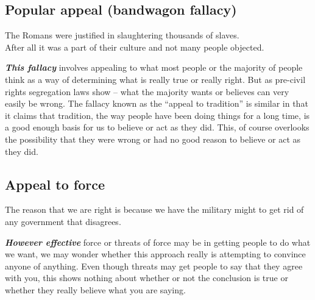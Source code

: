 \documentclass[12pt, openany]{book}
\begin{document}
\hypertarget{popular-appeal-bandwagon-fallacy}{%
\subsection*{Popular appeal (bandwagon fallacy)}\label{popular-appeal-bandwagon-fallacy}}


\begin{center}

\begin{argument}

The Romans were justified in slaughtering thousands of slaves.\\

After all it was a part of their culture and not many people objected.

\end{argument}

\end{center}

\textbf{\emph{This fallacy}} involves appealing to what most people or the majority of people think as a way of determining what is really true or really right. But as pre-civil rights segregation laws show -- what the majority wants or believes can very easily be wrong. The fallacy known as the ``appeal to tradition'' is similar in that it claims that tradition, the way people have been doing things for a long time, is a good enough basis for us to believe or act as they did. This, of course overlooks the possibility that they were wrong or had no good reason to believe or act as they did.

\hypertarget{appeal-to-force}{%
\subsection*{Appeal to force}\label{appeal-to-force}}


\begin{center}

\begin{argument}

The reason that we are right is because we have the military might to get rid of any government that disagrees.

\end{argument}

\end{center}

\textbf{\emph{However effective}} force or threats of force may be in getting people to do what we want, we may wonder whether this approach really is attempting to convince anyone of anything. Even though threats may get people to say that they agree with you, this shows nothing about whether or not the conclusion is true or whether they really believe what you are saying.
\end{document}
